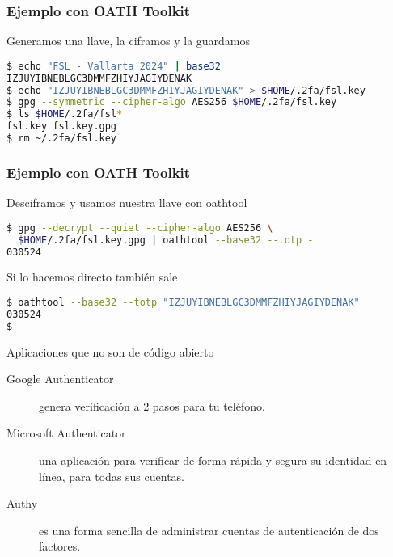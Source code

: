 \begin{frame}[fragile]
  \frametitle{Ejemplo con OATH Toolkit}
  Generamos una llave, la ciframos y la guardamos
  \begin{lstlisting}[language=Bash,numbers=none]
$ echo "FSL - Vallarta 2024" | base32
IZJUYIBNEBLGC3DMMFZHIYJAGIYDENAK
$ echo "IZJUYIBNEBLGC3DMMFZHIYJAGIYDENAK" > $HOME/.2fa/fsl.key
$ gpg --symmetric --cipher-algo AES256 $HOME/.2fa/fsl.key
$ ls $HOME/.2fa/fsl*
fsl.key fsl.key.gpg
$ rm ~/.2fa/fsl.key
  \end{lstlisting}
\end{frame}

\begin{frame}[fragile]
  \frametitle{Ejemplo con OATH Toolkit}
  Desciframos y usamos nuestra llave con oathtool
  \begin{lstlisting}[language=Bash,numbers=none]
$ gpg --decrypt --quiet --cipher-algo AES256 \
  $HOME/.2fa/fsl.key.gpg | oathtool --base32 --totp -
030524
  \end{lstlisting}

  \pausa
  \vspace{\baselineskip}
  Si lo hacemos directo también sale
  \begin{lstlisting}[language=Bash,numbers=none]
$ oathtool --base32 --totp "IZJUYIBNEBLGC3DMMFZHIYJAGIYDENAK"
030524
$
  \end{lstlisting}
\end{frame}

\begin{frame}[c]{Aplicaciones que no son de código abierto}
  \begin{description}
    \item [Google Authenticator] genera verificación a 2 pasos para tu
      teléfono.
    \item [Microsoft Authenticator] una aplicación para verificar de forma
      rápida y segura su identidad en línea, para todas sus cuentas.
    \item [Authy] es una forma sencilla de administrar cuentas de
      autenticación de dos factores.
  \end{description}
\end{frame}
